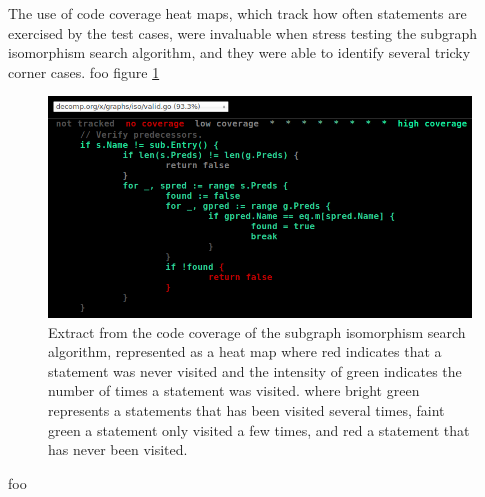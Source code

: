 The use of code coverage heat maps, which track how often statements are exercised by the test cases, were invaluable when stress testing the subgraph isomorphism search algorithm, and they were able to identify several tricky corner cases. foo figure \ref{fig:iso_heat_map}

\begin{figure}[htbp]
	\begin{center}
		\includegraphics[width=\textwidth]{inc/iso_code_coverage_heat_map.png}
		\caption{Extract from the code coverage of the subgraph isomorphism search algorithm, represented as a heat map where red indicates that a statement was never visited and the intensity of green indicates the number of times a statement was visited. where bright green represents a statements that has been visited several times, faint green a statement only visited a few times, and red a statement that has never been visited.}
		\label{fig:iso_heat_map}
	\end{center}
\end{figure}

foo
